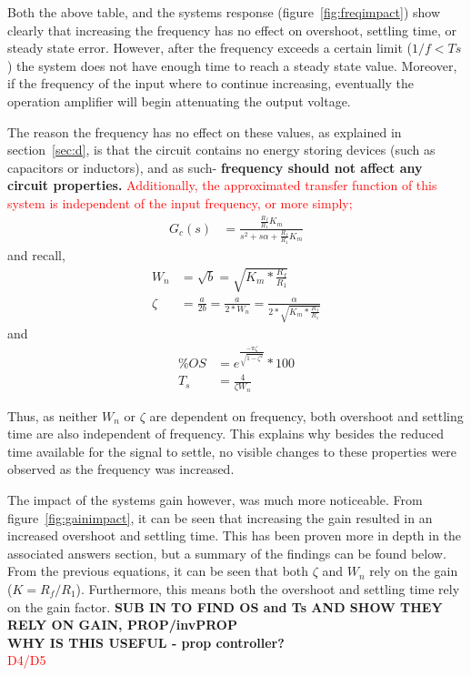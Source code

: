 \documentclass[11pt,a4paper]{article}
\begin{document}
Both the above table, and the systems response (figure~\ref{fig:freqimpact}) show clearly that increasing the frequency has no effect on overshoot, settling time, or steady state error. However, after the frequency exceeds a certain limit (\textbf{$1/f < Ts$}) the system does not have enough time to reach a steady state value. Moreover, if the frequency of the input where to continue increasing, eventually the operation amplifier will begin attenuating the output voltage. 

The reason the frequency has no effect on these values, as explained in section~\ref{sec:d}, is that the circuit contains no energy storing devices (such as capacitors or inductors), and as such- \textbf{frequency should not affect any circuit properties.} \textcolor{red}{Additionally, the approximated transfer function of this system is independent of the input frequency, or more simply;}
\begin{align*}
G_c(s) &= \frac{\frac{R_f}{R_1}K_m} {s^2 + s\alpha + \frac{R_f}{R_1}K_m}
\end{align*}
and recall, 
\begin{align*}
W_n &= \sqrt{b} = \sqrt{K_m * \frac{R_f}{R_1}} \\
\zeta &= \frac{a}{2b} = \frac{a}{2*W_n} = \frac{\alpha}{2*\sqrt{K_m * \frac{R_f}{R_1}}}
\end{align*}
and
\begin{align*}
\%OS &= e^{\frac{-\pi \zeta}{\sqrt{1-\zeta^2}}} * 100 \\
T_s &= \frac{4}{\zeta W_n}
\end{align*}

Thus, as neither $W_n$ or $\zeta$ are dependent on frequency, both overshoot and settling time are also independent of frequency. 
This explains why besides the reduced time available for the signal to settle, no visible changes to these properties were observed as the frequency was increased. 

The impact of the systems gain however, was much more noticeable. From figure~\ref{fig:gainimpact}, it can be seen that increasing the gain resulted in an increased overshoot and settling time. This has been proven more in depth in the associated answers section, but a summary of the findings can be found below.  \\
From the previous equations, it can be seen that both $\zeta$ and $W_n$ rely on the gain ($K = R_f/R_1$). Furthermore, this means both the overshoot and settling time rely on the gain factor.
\textbf{SUB IN TO FIND OS and Ts AND SHOW THEY RELY ON GAIN, PROP/invPROP}\\
\textbf{WHY IS THIS USEFUL - prop controller?}\\
\textcolor{red}{D4/D5}
\end{document}

